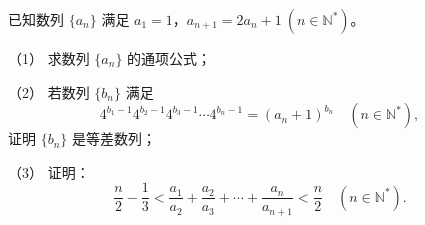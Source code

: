 \begin{question}
已知数列 $\{a_n\}$ 满足 $a_1=1$，$a_{n+1}=2a_n+1\ (n\in\mathbb{N}^*)$。

（1） 求数列 $\{a_n\}$ 的通项公式；

（2） 若数列 $\{b_n\}$ 满足
\nopagebreak[4]
\[
4^{b_1-1}4^{b_2-1}4^{b_3-1}\cdots4^{b_n-1}=(a_n+1)^{b_n}\quad(n\in\mathbb{N}^*),
\]
证明 $\{b_n\}$ 是等差数列；

（3） 证明：
\nopagebreak[4]
\[
\frac{n}{2}-\frac{1}{3}<\frac{a_1}{a_2}+\frac{a_2}{a_3}+\cdots+\frac{a_n}{a_{n+1}}<\frac{n}{2}\quad(n\in\mathbb{N}^*).
\]

\end{question}